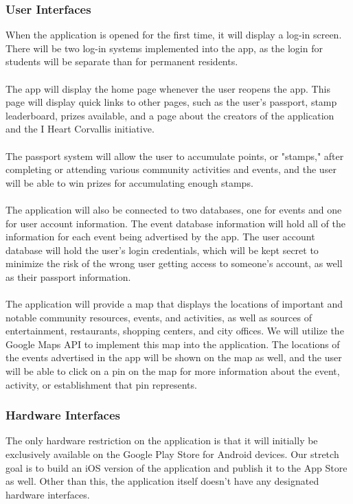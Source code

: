 \documentclass[draftclsnofoot, onecolumn, 10pt, compsoc]{IEEEtran}
\begin{document}
			\subsubsection{User Interfaces}
				When the application is opened for the first time, it will display a log-in screen. There will be two log-in systems implemented into the app, as the login for students will be separate than for permanent residents. \\ \\
				The app will display the home page whenever the user reopens the app. This page will display quick links to other pages, such as the user's passport, stamp leaderboard, prizes available, and a page about the creators of the application and the I Heart Corvallis initiative. \\ \\
				The passport system will allow the user to accumulate points, or "stamps," after completing or attending various community activities and events, and the user will be able to win prizes for accumulating enough stamps. \\ \\
				The application will also be connected to two databases, one for events and one for user account information. The event database information will hold all of the information for each event being advertised by the app. The user account database will hold the user's login credentials, which will be kept secret to minimize the risk of the wrong user getting access to someone's account, as well as their passport information. \\ \\
				The application will provide a map that displays the locations of important and notable community resources, events, and activities, as well as sources of entertainment, restaurants, shopping centers, and city offices. We will utilize the Google Maps API to implement this map into the application. The locations of the events advertised in the app will be shown on the map as well, and the user will be able to click on a pin on the map for more information about the event, activity, or establishment that pin represents.
				
			\subsubsection{Hardware Interfaces}
				The only hardware restriction on the application is that it will initially be exclusively available on the Google Play Store for Android devices. Our stretch goal is to build an iOS version of the application and publish it to the App Store as well. Other than this, the application itself doesn't have any designated hardware interfaces.
			
\end{document}
